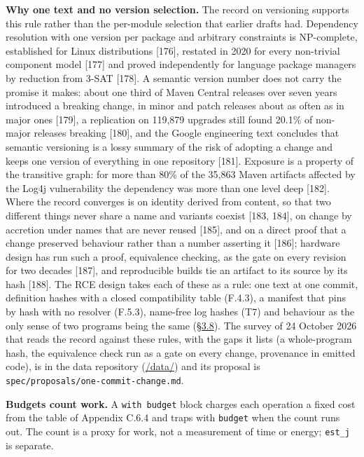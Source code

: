 \documentclass[10pt,letterpaper]{article}
\begin{document}
\textbf{Why one text and no version selection.} The record on versioning
supports this rule rather than the per-module selection that earlier
drafts had. Dependency resolution with one version per package and
arbitrary constraints is NP-complete, established for Linux
distributions {[}176{]}, restated in 2020 for every non-trivial
component model {[}177{]} and proved independently for language package
managers by reduction from 3-SAT {[}178{]}. A semantic version number
does not carry the promise it makes: about one third of Maven Central
releases over seven years introduced a breaking change, in minor and
patch releases about as often as in major ones {[}179{]}, a replication
on 119,879 upgrades still found 20.1\% of non-major releases breaking
{[}180{]}, and the Google engineering text concludes that semantic
versioning is a lossy summary of the risk of adopting a change and keeps
one version of everything in one repository {[}181{]}. Exposure is a
property of the transitive graph: for more than 80\% of the 35,863 Maven
artifacts affected by the Log4j vulnerability the dependency was more
than one level deep {[}182{]}. Where the record converges is on identity
derived from content, so that two different things never share a name
and variants coexist {[}183, 184{]}, on change by accretion under names
that are never reused {[}185{]}, and on a direct proof that a change
preserved behaviour rather than a number asserting it {[}186{]};
hardware design has run such a proof, equivalence checking, as the gate
on every revision for two decades {[}187{]}, and reproducible builds tie
an artifact to its source by its hash {[}188{]}. The RCE design takes
each of these as a rule: one text at one commit, definition hashes with
a closed compatibility table (F.4.3), a manifest that pins by hash with
no resolver (F.5.3), name-free log hashes (T7) and behaviour as the only
sense of two programs being the same
(\href{https://research.openie.dev/papers/rce/\#38-behaviour-equivalence-and-dimension}{§3.8}).
The survey of 24 October 2026 that reads the record against these rules,
with the gaps it lists (a whole-program hash, the equivalence check run
as a gate on every change, provenance in emitted code), is in the data
repository (\href{https://research.openie.dev/data/\#rce}{/data/}) and
its proposal is \texttt{spec/\allowbreak{}proposals/\allowbreak{}one-\allowbreak{}commit-\allowbreak{}change.\allowbreak{}md}.

\textbf{Budgets count work.} A \texttt{with\ budget} block charges each
operation a fixed cost from the table of Appendix C.6.4 and traps with
\texttt{budget} when the count runs out. The count is a proxy for work,
not a measurement of time or energy; \texttt{est\_j} is separate.
\end{document}
